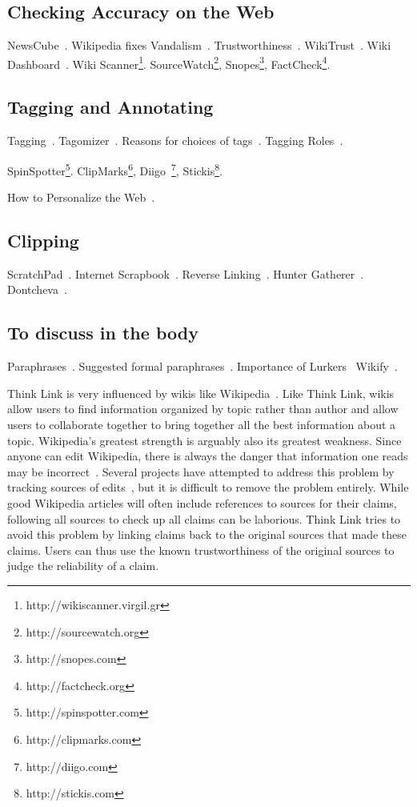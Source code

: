 \documentclass{chi2009}
\begin{document}
\subsection{Checking Accuracy on the Web}

NewsCube~\cite{Park2009}.
Wikipedia fixes Vandalism~\cite{Viegas2004}.
Trustworthiness~\cite{Gil2006}.
WikiTrust~\cite{Adler2008}. Wiki Dashboard~\cite{Kittur2008}.
Wiki Scanner\footnote{http://wikiscanner.virgil.gr}.
SourceWatch\footnote{http://sourcewatch.org}, Snopes\footnote{http://snopes.com}, FactCheck\footnote{http://factcheck.org}.

\subsection{Tagging and Annotating}

Tagging~\cite{Marlow2006}. Tagomizer~\cite{Park2007}. Reasons for choices of tags~\cite{Sen2006}. Tagging Roles~\cite{Muller2008}. 

SpinSpotter\footnote{http://spinspotter.com}. ClipMarks\footnote{http://clipmarks.com}, Diigo~\footnote{http://diigo.com}, Stickis\footnote{http://stickis.com}.

How to Personalize the Web~\cite{Barrett1997}. 

\subsection{Clipping}

ScratchPad~\cite{Gotz2007}. Internet Scrapbook~\cite{Sugiura1998}. Reverse Linking~\cite{Yesilada2007}. Hunter Gatherer~\cite{2002}. Dontcheva~\cite{Dontcheva2007a}.

\subsection{To discuss in the body}

Paraphrases~\cite{Chklovski2005}. Suggested formal paraphrases~\cite{Blythe2004}.
Importance of Lurkers~\cite{Takahashi2003}
Wikify~\cite{Mihalcea2007}.





Think Link is very influenced by wikis like Wikipedia~\cite{wikipedia}. Like Think Link, wikis allow users to find information organized by topic rather than author and allow users to collaborate together to bring together all the best information about a topic. Wikipedia's greatest strength is arguably also its greatest weakness. Since anyone can edit Wikipedia, there is always the danger that information one reads may be incorrect~\cite{wikifalse}. Several projects have attempted to address this problem by tracking sources of edits~\cite{wikicorrect,wikicorrect2,wikicorrect3}, but it is difficult to remove the problem entirely. While good Wikipedia articles will often include references to sources for their claims, following all sources to check up all claims can be laborious. Think Link tries to avoid this problem by linking claims back to the original sources that made these claims. Users can thus use the known trustworthiness of the original sources to judge the reliability of a claim. 
\end{document}
